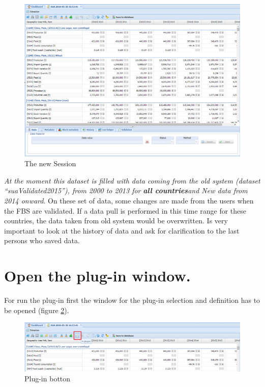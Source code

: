 \documentclass[]{article}
\begin{document}
\begin{figure}[H]

{\centering \includegraphics[width=1\linewidth]{images/pullData/11_session} 

}

\caption{\label{fig:f11}The new Session}\label{fig:f11}
\end{figure}

\emph{At the moment this dataset is filled with data coming from the old
system (dataset ``suaValidated2015''), from 2000 to 2013 for}
\textbf{\emph{all countries}}\emph{and New data from 2014 onward}. On
these set of data, some changes are made from the users when the FBS are
validated. If a data pull is performed in this time range for these
countries, the data taken from old system would be overwritten. Is very
important to look at the history of data and ask for clarification to
the last persons who saved data.

\section{Open the plug-in window.}\label{open-the-plug-in-window.}

For run the plug-in first the window for the plug-in selection and
definition has to be opened (figure \ref{fig:f12}).

\begin{figure}[H]

{\centering \includegraphics[width=1\linewidth]{images/pullData/12_runPlugin} 

}

\caption{\label{fig:f12}Plug-in botton}\label{fig:f12}
\end{figure}
\end{document}
